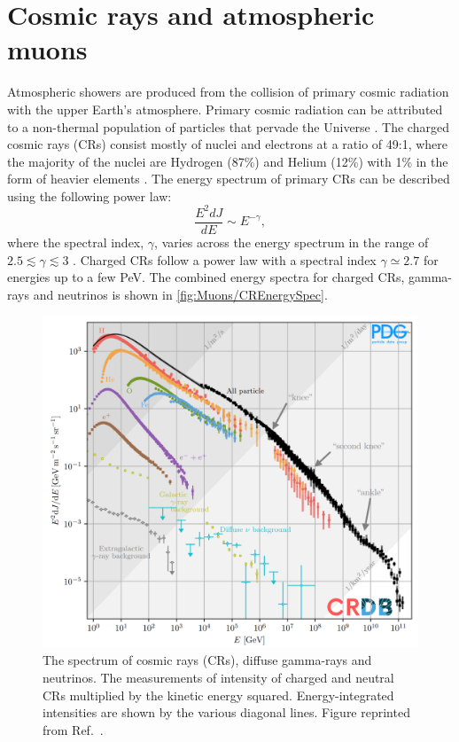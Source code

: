 \section{Cosmic rays and atmospheric muons}\label{sec:Muons/CosmicRays}
Atmospheric showers are produced from the collision of primary cosmic radiation with the upper Earth's atmosphere. Primary cosmic radiation can be attributed to a non-thermal population of particles that pervade the Universe \cite{ParticleDataGroup:2024cfk}. The charged cosmic rays (CRs) consist mostly of nuclei and electrons at a ratio of 49:1, where the majority of the nuclei are Hydrogen (87\%) and Helium (12\%) with 1\% in the form of heavier elements \cite{Longair_2011}. The energy spectrum of primary CRs can be described using the following power law:
\begin{equation}\label{eqn:Muons/CREnergy}
    \frac{E^2dJ}{dE}\sim E^{-\gamma},
\end{equation}
where the spectral index, $\gamma$, varies across the energy spectrum in the range of $2.5\lesssim\gamma\lesssim3$ \cite{ParticleDataGroup:2024cfk}. Charged CRs follow a power law with a spectral index $\gamma\simeq2.7$ for energies up to a few PeV. The combined energy spectra for charged CRs, gamma-rays and neutrinos is shown in \autoref{fig:Muons/CREnergySpec}.
\begin{figure}[ht!]
    \centering
    \includegraphics[width=0.8\linewidth]{figures/Muons/CosmicRaySpectra.png}
    \caption{The spectrum of cosmic rays (CRs), diffuse gamma-rays and neutrinos. The measurements of intensity of charged and neutral CRs multiplied by the kinetic energy squared. Energy-integrated intensities are shown by the various diagonal lines. Figure reprinted from Ref.~\cite{ParticleDataGroup:2024cfk}.}
    \label{fig:Muons/CREnergySpec}
\end{figure}
